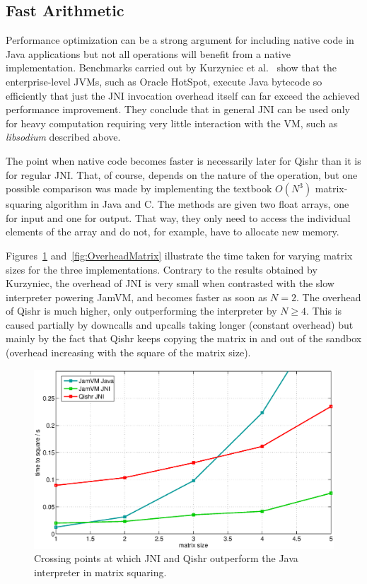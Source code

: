 \documentclass[a4paper,12pt,twoside,openright]{report}
\newcommand{\keyword}[1]{\textsf{#1}}
\newcommand{\tool}[1]{\emph{#1}}
\newcommand{\lib}[1]{\tool{lib#1}}
\begin{document}
\subsection{Fast Arithmetic}

Performance optimization can be a strong argument for including native code in Java applications but not all operations will benefit from a native implementation. Benchmarks carried out by Kurzyniec et al.~\cite{Kurzyniec01efficientcooperation} show that the enterprise-level JVMs, such as Oracle HotSpot, execute Java bytecode so efficiently that just the JNI invocation overhead itself can far exceed the achieved performance improvement. They conclude that in general JNI can be used only for heavy computation requiring very little interaction with the VM, such as \lib{sodium} described above. 

The point when native code becomes faster is necessarily later for Qishr than it is for regular JNI. That, of course, depends on the nature of the operation, but one possible comparison was made by implementing the textbook $O(N^3)$ matrix-squaring algorithm in Java and C. The methods are given two \keyword{float} arrays, one for input and one for output. That way, they only need to access the individual elements of the array and do not, for example, have to allocate new memory. 

Figures~\ref{fig:OverheadMatrixCrossing} and~\ref{fig:OverheadMatrix} illustrate the time taken for varying matrix sizes for the three implementations. Contrary to the results obtained by Kurzyniec, the overhead of JNI is very small when contrasted with the slow interpreter powering JamVM, and becomes faster as soon as $N=2$. The overhead of Qishr is much higher, only outperforming the interpreter by $N \ge 4$. This is caused partially by downcalls and upcalls taking longer (constant overhead) but mainly by the fact that Qishr keeps copying the matrix in and out of the sandbox (overhead increasing with the square of the matrix size).

\begin{figure}
	\centering
	\includegraphics[width=1.1\textwidth]{graph_matrix_crossing.eps}
	\caption{Crossing points at which JNI and Qishr outperform the Java interpreter in matrix squaring.}
	\label{fig:OverheadMatrixCrossing}
\end{figure}
\end{document}
